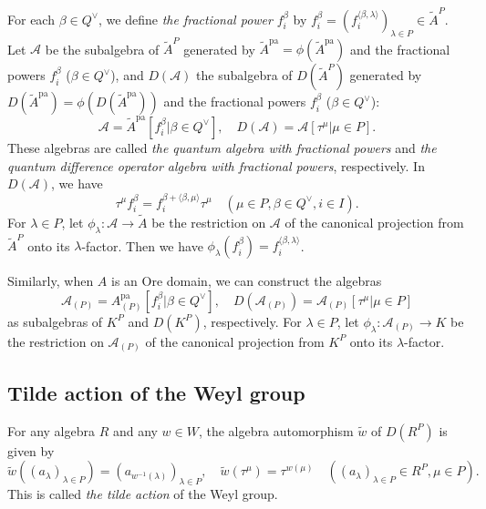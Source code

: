 \documentclass[12pt,twoside]{article}
\newcommand\bra{\langle}
\newcommand\ket{\rangle}
\newcommand\A{{\mathcal A}}
\newcommand\Qv{Q^\vee}
\newcommand\tw{{\widetilde w}}
\newcommand\tA{{\widetilde A}}
\newcommand\pa{{\mathrm{pa}}}
\theoremstyle{plain} %
\theoremstyle{definition} %
\theoremstyle{definition} %
\numberwithin{theorem}{section}
\numberwithin{equation}{section}
\numberwithin{figure}{section}
\numberwithin{table}{section}
\begin{document}
For each $\beta\in\Qv$, we define 
{\em the fractional power} $f_i^\beta$ by \(
 f_i^\beta=(f_i^{\bra\beta,\lambda\ket})_{\lambda\in P} \in\tA^P
\). Let $\A$ be the subalgebra of $\tA^P$ generated 
by $\tA^\pa=\phi(\tA^\pa)$ and the fractional powers $f_i^\beta$ ($\beta\in\Qv$),
and $D(\A)$ the subalgebra of $D(\tA^P)$ generated
by $D(\tA^\pa)=\phi(D(\tA^\pa))$ and the fractional powers $f_i^\beta$ ($\beta\in\Qv$):
\begin{equation*}
 \A    = \tA^\pa[f_i^\beta|\beta\in\Qv], \quad
 D(\A) = \A[\tau^\mu|\mu\in P].
\end{equation*}
These algebras are called {\em the quantum algebra with fractional powers}
and {\em the quantum difference operator algebra with fractional powers}, 
respectively. In $D(\A)$, we have
\begin{equation*}
 \tau^\mu f_i^\beta = f_i^{\beta+\bra\beta,\mu\ket}\tau^\mu
 \quad (\mu\in P, \beta\in\Qv, i\in I).
\end{equation*}
For $\lambda\in P$, let $\phi_\lambda:\A\to\tA$ be the restriction on $\A$ of 
the canonical projection from $\tA^P$ onto its $\lambda$-factor.
Then we have $\phi_\lambda(f_i^\beta)=f_i^{\bra\beta,\lambda\ket}$.

Similarly, when $A$ is an Ore domain, we can construct the algebras
\begin{equation*}
 \A_{(P)}    = A^\pa_{(P)}[f_i^\beta|\beta\in\Qv], \quad
 D(\A_{(P)}) = \A_{(P)}[\tau^\mu|\mu\in P]
\end{equation*}
as subalgebras of $K^P$ and $D(K^P)$, respectively.
For $\lambda\in P$, let $\phi_\lambda:\A_{(P)}\to K$ be 
the restriction on $\A_{(P)}$ of 
the canonical projection from $K^P$ onto its $\lambda$-factor.


\subsection{Tilde action of the Weyl group}
\label{sec:tilde}

For any algebra $R$ and any $w\in W$, 
the algebra automorphism $\tw$ of $D(R^P)$ is given by
\begin{equation*}
 \tw((a_\lambda)_{\lambda\in P}) = (a_{w^{-1}(\lambda)})_{\lambda\in P},
 \quad
 \tw(\tau^\mu) = \tau^{w(\mu)}
 \quad 
 ((a_\lambda)_{\lambda\in P}\in R^P, \mu\in P).
\end{equation*}
This is called {\em the tilde action} of the Weyl group.
\end{document}
